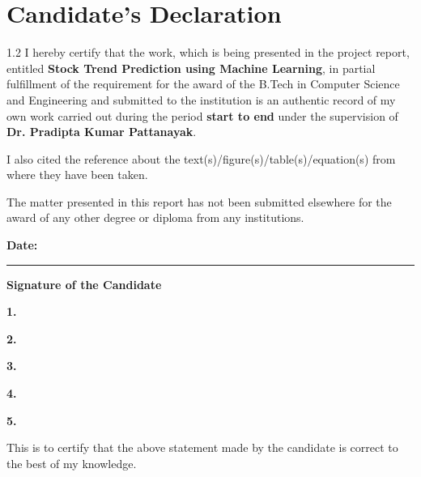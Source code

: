 \documentclass[12pt,a4paper]{report}
\begin{document}
\chapter*{Candidate's Declaration}
\begin{spacing}{1.2}
I hereby certify that the work, which is being presented in the project report, entitled \textbf{Stock Trend Prediction using Machine Learning}, in partial fulfillment of the requirement for the award of the B.Tech in Computer Science and Engineering  and submitted to the institution is an authentic record of my own work carried out during the period \textbf{start  to end} under the supervision of \textbf{Dr. Pradipta Kumar Pattanayak}.

I also cited the reference about the text(s)/figure(s)/table(s)/equation(s) from where they have been taken.
\newline

The matter presented in this report has not been submitted elsewhere for the award of any other degree or diploma from any institutions.
\newline
\newline
\newline

\textbf{Date:} \rule{3cm}{.15mm} \hspace{5cm} \textbf{Signature of the Candidate }
\newline
\rule{0cm}{0mm} \hspace{9cm} \textbf{1.}
\newline
\newline
\rule{0cm}{0mm} \hspace{9cm} \textbf{2.}
\newline
\newline
\rule{0cm}{0mm} \hspace{9cm} \textbf{3.}
\newline
\newline
\rule{0cm}{0mm} \hspace{9cm} \textbf{4.}
\newline
\newline
\rule{0cm}{0mm} \hspace{9cm} \textbf{5.}


\vspace{1cm}

This is to certify that the above statement made by the candidate is correct to the best of my knowledge.

\vspace{3cm}


\end{spacing}
\end{document}

